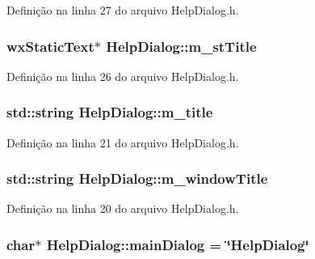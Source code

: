 Definição na linha 27 do arquivo Help\+Dialog.\+h.

\subsubsection[{m\+\_\+st\+Title}]{\setlength{\rightskip}{0pt plus 5cm}wx\+Static\+Text$\ast$ Help\+Dialog\+::m\+\_\+st\+Title\hspace{0.3cm}{\ttfamily [protected]}}\label{class_help_dialog_a5f5bb9ed09ecdea9dfc92c6a41e8fbd5}


Definição na linha 26 do arquivo Help\+Dialog.\+h.

\subsubsection[{m\+\_\+title}]{\setlength{\rightskip}{0pt plus 5cm}std\+::string Help\+Dialog\+::m\+\_\+title\hspace{0.3cm}{\ttfamily [protected]}}\label{class_help_dialog_ae404d97144e2817f41d8d30f06591b78}


Definição na linha 21 do arquivo Help\+Dialog.\+h.

\subsubsection[{m\+\_\+window\+Title}]{\setlength{\rightskip}{0pt plus 5cm}std\+::string Help\+Dialog\+::m\+\_\+window\+Title\hspace{0.3cm}{\ttfamily [protected]}}\label{class_help_dialog_acf16ee1354f2739a1f0654fe19193fe2}


Definição na linha 20 do arquivo Help\+Dialog.\+h.

\subsubsection[{main\+Dialog}]{\setlength{\rightskip}{0pt plus 5cm}char$\ast$ Help\+Dialog\+::main\+Dialog = \char`\"{}Help\+Dialog\char`\"{}\hspace{0.3cm}{\ttfamily [protected]}}\label{class_help_dialog_a13a81c1852528bfe7768f44f1e9eeff9}


